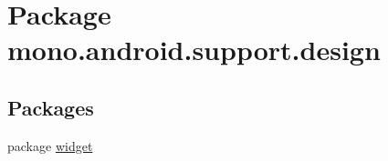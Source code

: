 \hypertarget{namespacemono_1_1android_1_1support_1_1design}{
\section{Package mono.android.support.design}
\label{namespacemono_1_1android_1_1support_1_1design}
}
\subsection*{Packages}
\begin{CompactItemize}
\item 
package \hyperlink{namespacemono_1_1android_1_1support_1_1design_1_1widget}{widget}
\end{CompactItemize}
